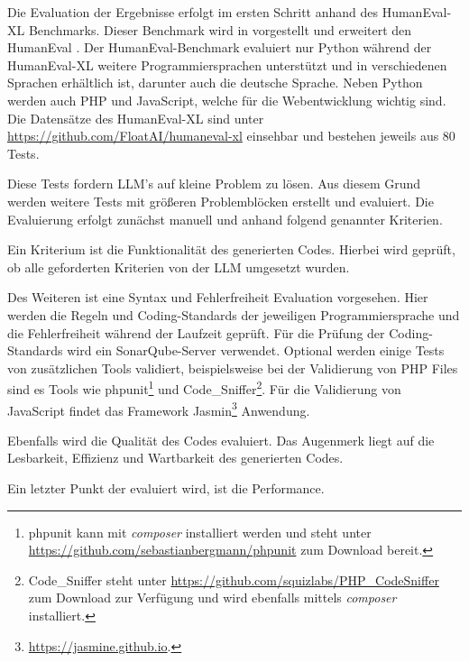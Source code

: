 Die Evaluation der Ergebnisse erfolgt im ersten Schritt anhand des HumanEval-XL Benchmarks. Dieser Benchmark wird in \cite{peng-2024} vorgestellt und erweitert den HumanEval \cite{chen-2021}. Der HumanEval-Benchmark evaluiert nur Python während der HumanEval-XL weitere Programmiersprachen unterstützt und in verschiedenen Sprachen erhältlich ist, darunter auch die deutsche Sprache. Neben Python werden auch PHP und JavaScript, welche für die Webentwicklung wichtig sind. Die Datensätze des HumanEval-XL sind unter \href{https://github.com/FloatAI/humaneval-xl}{https://github.com/FloatAI/humaneval-xl} einsehbar und bestehen jeweils aus 80 Tests.\vspace{0.2cm}

Diese Tests fordern LLM's auf kleine Problem zu lösen. Aus diesem Grund werden weitere Tests mit größeren Problemblöcken erstellt und evaluiert. Die Evaluierung erfolgt zunächst manuell und anhand folgend genannter Kriterien.\vspace{0.2cm}

Ein Kriterium ist die Funktionalität des generierten Codes. Hierbei wird geprüft, ob alle geforderten Kriterien von der LLM umgesetzt wurden.\vspace{0.2cm}

Des Weiteren ist eine Syntax und Fehlerfreiheit Evaluation vorgesehen. Hier werden die Regeln und Coding-Standards der jeweiligen Programmiersprache und die Fehlerfreiheit während der Laufzeit geprüft. Für die Prüfung der Coding-Standards wird ein SonarQube-Server verwendet. Optional werden einige Tests von zusätzlichen Tools validiert, beispielsweise bei der Validierung von PHP Files sind es Tools wie phpunit\footnote{phpunit kann mit \textit{composer} installiert werden und steht unter \href{https://github.com/sebastianbergmann/phpunit}{https://github.com/sebastianbergmann/phpunit} zum Download bereit.} und Code\_Sniffer\footnote{Code\_Sniffer steht unter \href{https://github.com/squizlabs/PHP_CodeSniffer}{https://github.com/squizlabs/PHP\_CodeSniffer} zum Download zur Verfügung und wird ebenfalls mittels \textit{composer} installiert.}. Für die Validierung von JavaScript findet das Framework Jasmin\footnote{\href{https://jasmine.github.io/}{https://jasmine.github.io}.} Anwendung.


Ebenfalls wird die Qualität des Codes evaluiert. Das Augenmerk liegt auf die Lesbarkeit, Effizienz und Wartbarkeit des generierten Codes.\vspace{0.2cm}

Ein letzter Punkt der evaluiert wird, ist die Performance.


